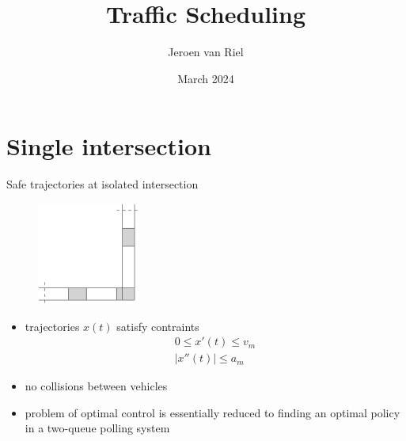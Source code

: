 \documentclass[bigger]{beamer}
\author{Jeroen van Riel}
\date{March 2024}
\title{Traffic Scheduling}
\begin{document}
\maketitle
\section{Single intersection}
\label{sec:orgde4894b}

\begin{frame}[label={sec:orgeed6ea9}]{Safe trajectories at isolated intersection}
\begin{figure}
  \centering
  \includegraphics[width=0.3\textwidth]{../figures/miculescu_karaman.pdf}
\end{figure}

\begin{itemize}
\item trajectories \(x(t)\) satisfy contraints
\begin{subequations}
\begin{align}
0 \leq x'(t) \leq v_m \\
|x''(t)| \leq a_m
\end{align}
\end{subequations}
\item no collisions between vehicles

\item problem of optimal control is essentially reduced to finding an optimal policy in a two-queue polling system \cite{miculescuPollingsystemsbasedAutonomousVehicle2016}
\end{itemize}
\end{frame}
\end{document}
